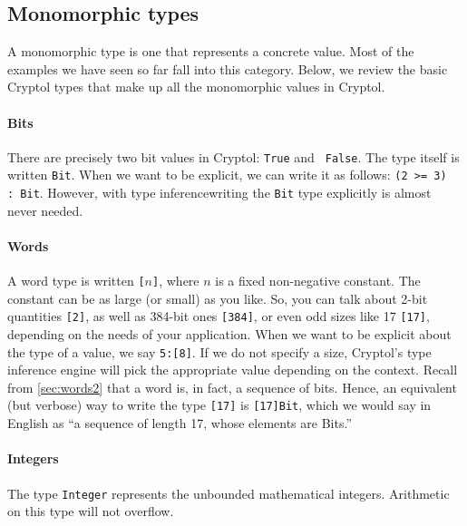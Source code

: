
\subsection{Monomorphic types}\indMonomorphism
\label{sec:monomorphic-types}

A monomorphic type is one that represents a concrete value. Most of
the examples we have seen so far fall into this category. Below, we
review the basic Cryptol types that make up all the monomorphic values
in Cryptol.

\paragraph*{Bits}\indTheBitType\indTrue\indFalse There are precisely
two bit values in Cryptol: {\tt True} and {\tt
  False}. The type itself is written {\tt Bit}. When we want to be
explicit, we can write it as follows: \texttt{(2 >= 3) :\ Bit}. However,
with type inference\indTypeInference writing the {\tt Bit} type
explicitly is almost never needed.

\paragraph*{Words}\indTheWordType\indTheBitType A word type is written
{\tt [}$n${\tt ]}, where $n$ is a fixed
non-negative constant. The constant can be as large (or small) as you
like.  So, you can talk about 2-bit quantities {\tt [2]}, as well as
384-bit ones {\tt [384]}, or even odd sizes like 17 {\tt [17]},
depending on the needs of your application. When we want to be
explicit about the type of a value, we say {\tt 5:[8]}. If we do not
specify a size, Cryptol's type inference engine will pick the
appropriate value depending on the context.\indTypeInference
Recall from \autoref{sec:words2} that a word is, in fact, a
sequence of bits.  Hence, an equivalent (but verbose) way to write the
type {\tt [17]} is {\tt [17]Bit}, which we would say in English as
``a sequence of length 17, whose elements are Bits.''

\paragraph*{Integers}\indTheIntegerType The type \texttt{Integer}
represents the unbounded mathematical integers. Arithmetic on this
type will not overflow.

